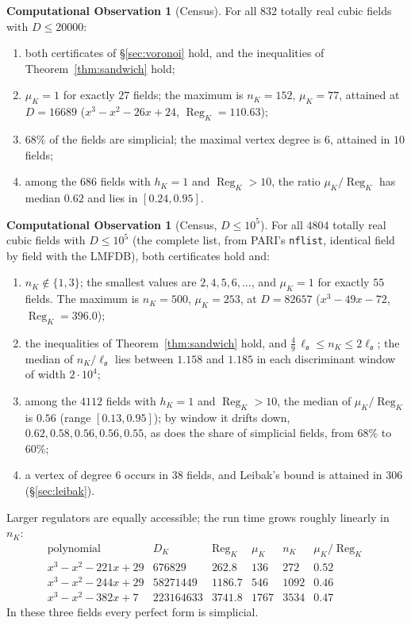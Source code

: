 \documentclass[11pt,reqno]{amsart}
\theoremstyle{plain}
\theoremstyle{definition}
\newtheorem{observation}[theorem]{Computational Observation}
\newcommand{\Reg}{\operatorname{Reg}}
\newcommand{\Ok}{\mathfrak{o}}
\newcommand{\nK}{n_K}
\newcommand{\muK}{\mu_K}
\begin{document}
\begin{observation}[Census]\label{obs:census}
For all $832$ totally real cubic fields with $D\le20000$:
\begin{enumerate}[label=\textup{(\alph*)},leftmargin=2.2em]
\item both certificates of \S\ref{sec:voronoi} hold, and the inequalities of Theorem~\ref{thm:sandwich}
hold;
\item $\muK=1$ for exactly $27$ fields; the maximum is $\nK=152$, $\muK=77$, attained at $D=16689$
\textup{(}$x^3-x^2-26x+24$, $\Reg_K=110.63$\textup{)};
\item $68\%$ of the fields are simplicial; the maximal vertex degree is $6$, attained in $10$ fields;
\item among the $686$ fields with $h_K=1$ and $\Reg_K>10$, the ratio $\muK/\Reg_K$ has median $0.62$ and
lies in $[0.24,0.95]$.
\end{enumerate}
\end{observation}

\begin{observation}[Census, $D\le10^5$]\label{obs:census5}
For all $4804$ totally real cubic fields with $D\le10^5$ (the complete list, from PARI's \texttt{nflist},
identical field by field with the LMFDB), both certificates hold and:
\begin{enumerate}[label=\textup{(\alph*)},leftmargin=2.2em]
\item $\nK\notin\{1,3\}$; the smallest values are $2,4,5,6,\dots$, and $\muK=1$ for exactly $55$ fields. The
maximum is $\nK=500$, $\muK=253$, at $D=82657$ \textup{(}$x^3-49x-72$, $\Reg_K=396.0$\textup{)};
\item the inequalities of Theorem~\ref{thm:sandwich} hold, and $\tfrac49\,\ell_\Ok\le\nK\le2\ell_\Ok$; the
median of $\nK/\ell_\Ok$ lies between $1.158$ and $1.185$ in each discriminant window of width $2\cdot10^4$;
\item among the $4112$ fields with $h_K=1$ and $\Reg_K>10$, the median of $\muK/\Reg_K$ is $0.56$ (range
$[0.13,0.95]$); by window it drifts down, $0.62,0.58,0.56,0.56,0.55$, as does the share of simplicial
fields, from $68\%$ to $60\%$;
\item a vertex of degree $6$ occurs in $38$ fields, and Leibak's bound is attained in $306$
(\S\ref{sec:leibak}).
\end{enumerate}
\end{observation}

Larger regulators are equally accessible; the run time grows roughly linearly in $\nK$:
\[
\renewcommand{\arraystretch}{1.15}
\begin{array}{c|c|c|c|c|c}
\text{polynomial} & D_K & \Reg_K & \muK & \nK & \muK/\Reg_K\\\hline
x^3-x^2-221x+29 & 676829 & 262.8 & 136 & 272 & 0.52\\
x^3-x^2-244x+29 & 58271449 & 1186.7 & 546 & 1092 & 0.46\\
x^3-x^2-382x+7 & 223164633 & 3741.8 & 1767 & 3534 & 0.47
\end{array}
\]
In these three fields every perfect form is simplicial.
\end{document}
